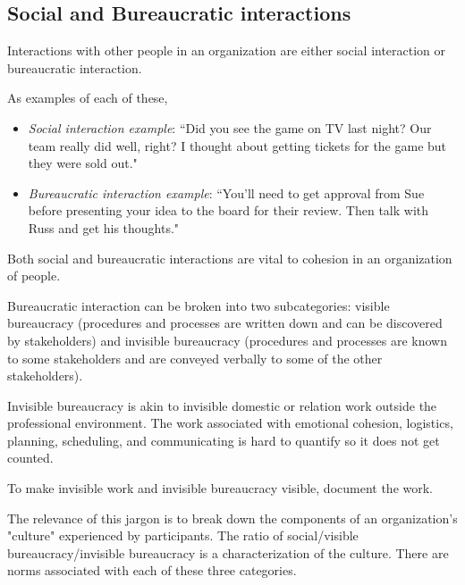 
\subsection{Social and Bureaucratic interactions}

Interactions with other people in an organization are either social interaction or bureaucratic interaction. 

As examples of each of these,
\begin{itemize}
\item \textit{Social interaction example}: ``Did you see the game on TV last night? Our team really did well, right? I thought about getting tickets for the game but they were sold out."
\item \textit{Bureaucratic interaction example}: ``You'll need to get approval from Sue before presenting your idea to the board for their review. Then talk with Russ and get his thoughts."
\end{itemize}
Both social and bureaucratic interactions are vital to cohesion in an organization of people. 


Bureaucratic interaction can be broken into two subcategories: \gls{visible bureaucracy} (procedures and processes are written down and can be discovered by stakeholders)  and \gls{invisible bureaucracy} (procedures and processes are known to some stakeholders and are conveyed verbally to some of the other stakeholders).

Invisible bureaucracy is akin to invisible domestic or relation work outside the professional environment. The work associated with emotional cohesion, logistics, planning, scheduling, and communicating is hard to quantify so it does not get counted.

To make invisible work and invisible bureaucracy visible, document the work.


The relevance of this jargon is to break down the components of an organization's "culture" experienced by participants. The ratio of social/visible bureaucracy/invisible bureaucracy is a characterization of the culture. There are norms associated with each of these three categories.